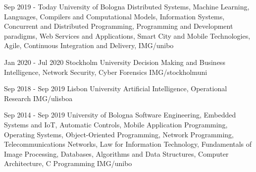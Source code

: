 \documentclass[paper=a4,fontsize=11pt]{temp} %
\begin{document}
\noindent

{Sep 2019 - Today}
{University of Bologna}
{Distributed Systems, Machine Learning,    Languages, Compilers and Computational Models,    Information Systems,     Concurrent and Distributed Programming,    Programming and Development paradigms,    Web Services and Applications,     Smart City and Mobile Technologies,     Agile, Continuous Integration and Delivery,  } 
 {IMG/unibo}

\sepspace

{Jan 2020 - Jul 2020}
{Stockholm University}
{Decision Making and Business Intelligence, Network Security, Cyber Forensics}
{IMG/stockholmuni}

\sepspace

{Sep 2018 - Sep 2019}
{Lisbon University}
{Artificial Intelligence, Operational Research} 
{IMG/ulisboa}

\sepspace

{Sep 2014 - Sep 2019}
{University of Bologna }
{Software Engineering, Embedded Systems and IoT, Automatic Controls, Mobile Application Programming, Operating Systems, Object-Oriented Programming, Network Programming, Telecommunications Networks, Law for Information Technology, Fundamentals of Image Processing, Databases, Algorithms and Data Structures, Computer Architecture, C Programming} 
{IMG/unibo}
\end{document}
